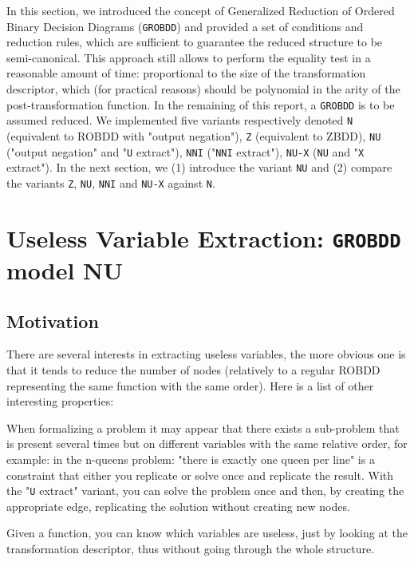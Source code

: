 \documentclass[a4paper,10pt]{article}
\newcommand{\uextract}{"\texttt{U} extract"}
\newcommand{\nniextract}{"\texttt{NNI} extract"}
\newcommand{\xextract}{"\texttt{X} extract"}
\newcommand{\GroBdd}{\texttt{GROBDD}}
\begin{document}
In this section, we introduced the concept of Generalized Reduction of Ordered Binary Decision Diagrams (\GroBdd{}) and provided a set of conditions and reduction rules, which are sufficient to guarantee the reduced structure to be semi-canonical.
This approach still allows to perform the equality test in a reasonable amount of time: proportional to the size of the transformation descriptor, which (for practical reasons) should be polynomial in the arity of the post-transformation function.
In the remaining of this report, a \GroBdd{} is to be assumed reduced.
We implemented five variants respectively denoted \texttt{N} (equivalent to ROBDD with "output negation"), \texttt{Z} (equivalent to ZBDD), \texttt{NU} ("output negation" and \uextract{}), \texttt{NNI} (\nniextract), \texttt{NU-X} (\texttt{NU} and \xextract{}).
In the next section, we (1) introduce the variant \texttt{NU} and (2) compare the variants \texttt{Z}, \texttt{NU}, \texttt{NNI} and \texttt{NU-X} against \texttt{N}.


\section{Useless Variable Extraction: \GroBdd{} model NU}

\subsection{Motivation}

There are several interests in extracting useless variables, the more obvious one is that it tends to reduce the number of nodes (relatively to a regular ROBDD representing the same function with the same order).
Here is a list of other interesting properties: \begin{compactitem}
\item When formalizing a problem it may appear that there exists a sub-problem that is present several times but on different variables with the same relative order, for example: in the n-queens problem: "there is exactly one queen per line" is a constraint that either you replicate or solve once and replicate the result.
With the \uextract{} variant, you can solve the problem once and then, by creating the appropriate edge, replicating the solution without creating new nodes.
\item Given a function, you can know which variables are useless, just by looking at the transformation descriptor, thus without going through the whole structure.
\end{compactitem}
\end{document}
